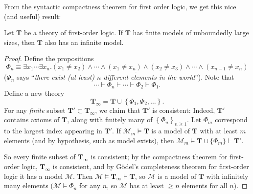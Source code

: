\documentclass[12pt]{article}
\newcommand{\T}{\textbf{T}}
\newcommand{\M}{\mathcal{M}}
\begin{document}
From the syntactic compactness theorem for first order logic, we get this nice (and useful) result:

Let $\T$ be a theory of first-order logic.  If $\T$ has finite models of unboundedly large sizes, then $\T$ also has an infinite model.

\begin{proof}
Define the propositions
$$
\Phi_n \equiv \underline{\exists x_1 \cdots \exists x_n . (x_1\ne x_2)\wedge \cdots \wedge(x_1\ne x_n)
\wedge(x_2\ne x_3)\wedge \cdots \wedge(x_{n-1}\ne x_n)}
$$
($\Phi_n$ says ``\textit{there exist (at least) $n$ \emph{different} elements in the world}'').  Note that
$$\cdots \vdash \Phi_n \vdash \cdots \vdash \Phi_2 \vdash \Phi_1.$$
Define a new theory
$$
\T_\infty = \T \cup \left\{\Phi_1, \Phi_2, \ldots \right\}.
$$
For any \emph{finite} subset $\T'\subset \T_\infty$, we claim that $\T'$ is consistent:  Indeed, $\T'$ contains axioms of $\T$, along with finitely many of $\left\{\Phi_n\right\}_{n\ge 1}$.  Let $\Phi_m$ correspond to the largest index appearing in $\T'$.  If $\M_m\models\T$ is a model of $\T$ with at least $m$ elements (and by hypothesis, such as model exists), then $\M_m\models \T\cup\{\Phi_m\}\vdash\T'$.

So every finite subset of $\T_\infty$ is consistent; by the compactness theorem for first-order logic, $\T_\infty$ is consistent, and by G\"odel's completeness theorem for first-order logic it has a model $\M$.  Then $\M\models\T_\infty\vdash\T$, so $\M$ is a model of $\T$ with infinitely many elements ($\M\models \Phi_n$ for any $n$, so $\M$ has at least $\ge n$ elements for all $n$).
\end{proof}
\end{document}
